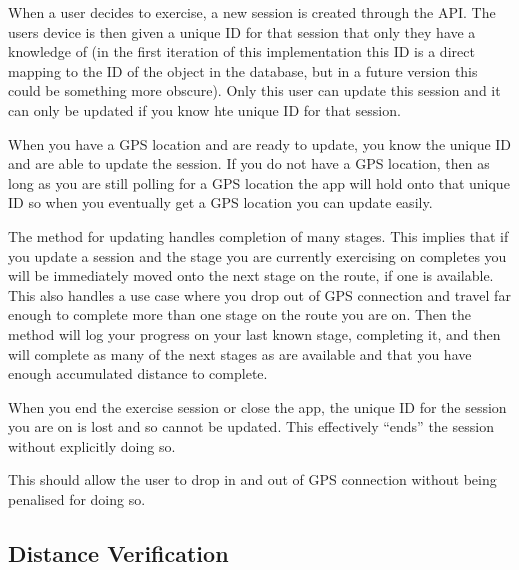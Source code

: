 When a user decides to exercise, a new session is created through the
API. The users device is then given a unique ID for that session that
only they have a knowledge of (in the first iteration of this
implementation this ID is a direct mapping to the ID of the object in
the database, but in a future version this could be something more
obscure). Only this user can update this session and it can only be
updated if you know hte unique ID for that session. 

When you have a GPS location and are ready to update, you know the
unique ID and are able to update the session. If you do not have a GPS
location, then as long as you are still polling for a GPS location the
app will hold onto that unique ID so when you eventually get a GPS
location you can update easily.

The method for updating handles completion of many stages. This
implies that if you update a session and the stage you are currently
exercising on completes you will be immediately moved onto the next
stage on the route, if one is available. This also handles a use case
where you drop out of GPS connection and travel far enough to complete
more than one stage on the route you are on. Then the method will log
your progress on your last known stage, completing it, and then will
complete as many of the next stages as are available and that you have
enough accumulated distance to complete.

When you end the exercise session or close the app, the unique ID for
the session you are on is lost and so cannot be updated. This
effectively ``ends'' the session without explicitly doing so.

This should allow the user to drop in and out of GPS connection
without being penalised for doing so.

\subsection{Distance Verification}


